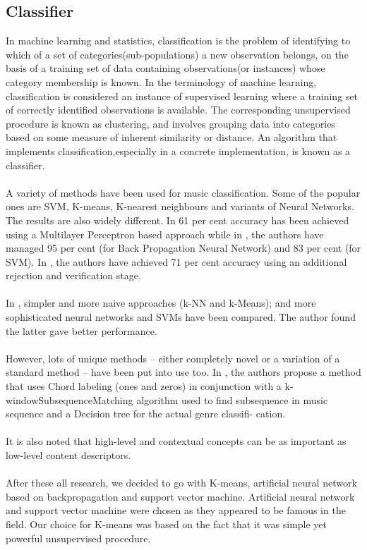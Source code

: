 \subsection{Classifier}
In machine learning and statistics, classification is the problem of identifying to which of a set of categories(sub-populations) a 
new observation belongs, on the basis of a training set of data containing observations(or instances) whose category membership is known.
In the terminology of machine learning, classification is considered an instance of supervised learning where a training set of correctly identified observations is available.
The corresponding unsupervised procedure is known as clustering, and involves grouping data into categories based on some measure of inherent similarity or distance.
An algorithm that implements classification,especially in a concrete implementation, is known as a classifier.\\
\\
A variety of methods have been used for music classification. Some of the popular ones are
SVM, K-means, K-nearest neighbours and variants of Neural Networks.
The results are also widely different. In \cite{Neumayer2004} 61 per cent accuracy has been achieved using
a Multilayer Perceptron based approach while in \cite{Kour2015}, the authors have managed 95 per cent
(for Back Propagation Neural Network) and 83 per cent (for SVM).
In \cite{Koerich2013}, the authors have achieved 71 per cent accuracy using an additional rejection and
verification stage.\\
\\
In \cite{Haggblade2011}, simpler and more naive approaches (k-NN and k-Means); and more sophisticated
neural networks and SVMs have been compared. The author found the latter gave better
performance.\\
\\
However, lots of unique methods – either completely novel or a variation of a standard
method – have been put into use too. In \cite{Nasridinov2014}, the authors propose a method that uses Chord
labeling (ones and zeros) in conjunction with a k-windowSubsequenceMatching algorithm
used to find subsequence in music sequence and a Decision tree for the actual genre classifi-
cation.\\
\\
It is also noted that high-level and contextual concepts can be as important as low-level
content descriptors\cite{Anglade2010}.\\
\\
After these all research, we decided to go with K-means, artificial neural network based on backpropagation
and support vector machine. Artificial neural network and support vector machine were chosen as they appeared to be famous in the field. Our choice for K-means 
was based on the fact that it was simple yet powerful unsupervised procedure.

